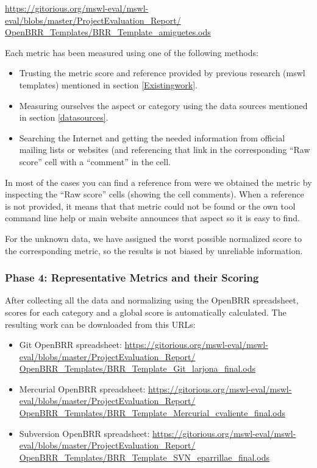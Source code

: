 \documentclass[a4paper,10pt]{article}
\begin{document}
\url{
https://gitorious.org/mswl-eval/mswl-eval/blobs/master/ProjectEvaluation_Report/
OpenBRR_Templates/BRR_Template_amiguetes.ods}

Each metric has been measured using one of the following methods:
\begin{itemize}
 \item Trusting the metric score and reference provided by previous research
(mswl templates) mentioned in section \ref{Existingwork}.
 \item Measuring ourselves the aspect or category using the data sources
mentioned in section \ref{datasources}.
 \item Searching the Internet and getting the needed information from official
mailing lists or websites (and referencing that link in the corresponding ``Raw
score'' cell with a ``comment'' in the cell.
\end{itemize}

In most of the cases you can find a reference from were we obtained the metric
by inspecting the ``Raw score'' cells (showing the cell comments). When a
reference is not provided, it means that that metric could not be found
or the own tool command line help or main website announces that aspect so it is
easy to find.

For the unknown data, we have assigned the worst possible normalized score to
the corresponding metric, so the results is not biased by unreliable
information.

\subsubsection{Phase 4: Representative Metrics and their Scoring}

After collecting all the data and normalizing using the OpenBRR spreadsheet,
scores for each category and a global score is automatically calculated.
The resulting work can be downloaded from this URLs:
\begin{itemize}
 \item Git OpenBRR spreadsheet:
\url{
https://gitorious.org/mswl-eval/mswl-eval/blobs/master/ProjectEvaluation_Report/
OpenBRR_Templates/BRR_Template_Git_larjona_final.ods}

 \item Mercurial OpenBRR spreadsheet:
\url{
https://gitorious.org/mswl-eval/mswl-eval/blobs/master/ProjectEvaluation_Report/
OpenBRR_Templates/BRR_Template_Mercurial_cvaliente_final.ods}

 \item Subversion OpenBRR spreadsheet:
\url{
https://gitorious.org/mswl-eval/mswl-eval/blobs/master/ProjectEvaluation_Report/
OpenBRR_Templates/BRR_Template_SVN_eparrillae_final.ods}

\end{itemize}
\end{document}

